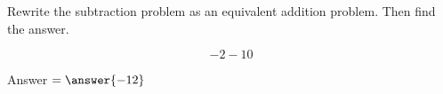 \documentclass{ximera}[font=12pt]
\begin{document}


\begin{problem}
Rewrite the subtraction problem as an equivalent addition problem.  Then find the answer.

\[ -2 - 10 \]

\begin{multipleChoice}
\end{multipleChoice}

\begin{problem}
Answer $ = \answer{-12}$

\end{problem}
\end{problem}
\end{document}
